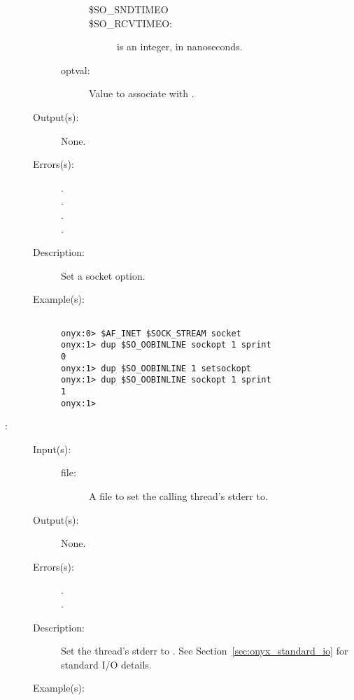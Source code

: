 \begin{description}
\begin{description}
\begin{description}
\begin{description}
			\item[\$SO\_SNDTIMEO]
			\item[\$SO\_RCVTIMEO: ]
				 is an integer, in nanoseconds.
			\end{description}
		\item[optval: ]
			Value to associate with .
		\end{description}
	\item[Output(s): ] None.
	\item[Errors(s): ]
		\begin{description}\item[]
		\item[.]
		\item[.]
		\item[.]
		\item[.]
		\end{description}
	\item[Description: ]
		Set a socket option.
	\item[Example(s): ]\begin{verbatim}

onyx:0> $AF_INET $SOCK_STREAM socket
onyx:1> dup $SO_OOBINLINE sockopt 1 sprint
0
onyx:1> dup $SO_OOBINLINE 1 setsockopt 
onyx:1> dup $SO_OOBINLINE sockopt 1 sprint
1
onyx:1>
		\end{verbatim}
	\end{description}
\label{systemdict:setstderr}
\item[{\onyxop{file}{setstderr}{--}}: ]
	\begin{description}\item[]
	\item[Input(s): ]
		\begin{description}\item[]
		\item[file: ]
			A file to set the calling thread's stderr to.
		\end{description}
	\item[Output(s): ] None.
	\item[Errors(s): ]
		\begin{description}\item[]
		\item[.]
		\item[.]
		\end{description}
	\item[Description: ]
		Set the thread's stderr to .  See
		Section~\ref{sec:onyx_standard_io} for standard I/O details.
	\item[Example(s): ]\begin{verbatim}


\end{verbatim}
\end{description}
\end{description}
